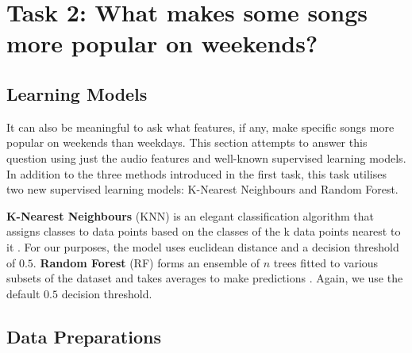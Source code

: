 \documentclass{article}
\begin{document}

\section{Task 2: What makes some songs more popular on weekends?}

\subsection{Learning Models}

It can also be meaningful to ask what features, if any, make specific songs more popular on weekends than weekdays. This section attempts to answer this question using just the audio features and well-known supervised learning models. In addition to the three methods introduced in the first task, this task utilises two new supervised learning models: K-Nearest Neighbours and Random Forest.

\textbf{K-Nearest Neighbours} (KNN) is an elegant classification algorithm that assigns classes to data points based on the classes of the k data points nearest to it \cite{a2024_16}. For our purposes, the model uses euclidean distance and a decision threshold of $0.5$. \textbf{Random Forest} (RF) forms an ensemble of $n$ trees fitted to various subsets of the dataset and takes averages to make predictions \cite{a2018_sklearnensemblerandomforestclassifier}. Again, we use the default $0.5$ decision threshold.

\subsection{Data Preparations}
\end{document}
